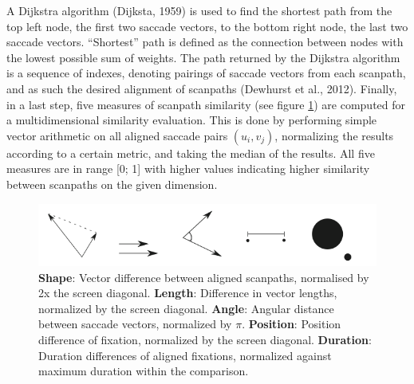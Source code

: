 \documentclass[a4paper, 11pt]{scrreprt}
\begin{document}
A Dijkstra algorithm (Dijksta, 1959) is used to find the shortest path from the top left node, the first two saccade vectors, to the bottom right node, the last two saccade vectors. “Shortest” path is defined as the connection between nodes with the lowest possible sum of weights. The path returned by the Dijkstra algorithm is a sequence of indexes, denoting pairings of saccade vectors from each scanpath, and as such the desired alignment of scanpaths (Dewhurst et al., 2012).  Finally, in a last step, five measures of scanpath similarity (see figure \ref{fig:simmeasures}) are computed for a multidimensional similarity evaluation. This is done by performing simple vector arithmetic on all aligned saccade pairs $(u_i, v_j)$, normalizing the results according to a certain metric, and taking the median of the results. All five measures are in range [0; 1] with higher values indicating higher similarity between scanpaths on the given dimension. \newline

\begin{figure}
	\includegraphics[scale=0.5]{img/simmeasures.png}
	\caption[Similarity measures]{\small{\textbf{Shape}: Vector difference between aligned scanpaths, normalised by 2x the screen diagonal. \textbf{Length}: Difference in vector lengths, normalized by the screen diagonal. \textbf{Angle}: Angular distance between saccade vectors, normalized by $\pi$. \textbf{Position}: Position difference of fixation, normalized by the screen diagonal. \textbf{Duration}: Duration differences of aligned fixations, normalized against maximum duration within the comparison.}}
	\label{fig:simmeasures}
\end{figure}
\end{document}
